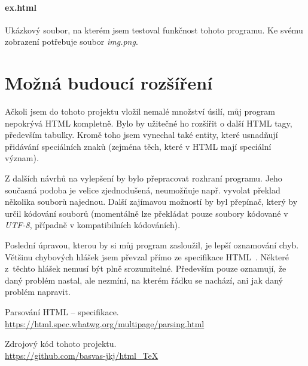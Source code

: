 \documentclass[a4paper,12pt]{article}
\begin{document}
	\paragraph{ex.html}
	Ukázkový soubor, na kterém jsem testoval funkčnost tohoto programu. Ke svému zobrazení potřebuje soubor \emph{img.png}.

	\section{Možná budoucí rozšíření}
	Ačkoli jsem do tohoto projektu vložil nemalé množství úsilí, můj program nepokrývá HTML kompletně.
	Bylo by užitečné ho rozšířit o další HTML tagy, především tabulky. Kromě toho jsem vynechal
	také entity, které usnadňují přidávání speciálních znaků (zejména těch, které v HTML mají speciální
	význam).
	
	Z dalších návrhů na vylepšení by bylo přepracovat rozhraní programu. Jeho současná podoba je velice
	zjednodušená, neumožňuje např. vyvolat překlad několika souborů najednou. Další zajímavou možností 
	by byl přepínač, který by určil kódování souborů (momentálně lze překládat pouze soubory kódované v \textit{UTF-8}, případně v kompatibilních kódováních).
	
	Poslední úpravou, kterou by si můj program zasloužil, je lepší oznamování chyb. Většinu chybových hlášek jsem převzal přímo ze specifikace HTML~\cite{specifikace}. Některé z~těchto hlášek nemusí být plně srozumitelné. Především pouze oznamují, že daný problém nastal, ale nezmíní, na kterém řádku se nachází, ani jak daný problém napravit.
	\pagebreak
	
	\begin{thebibliography}{99}
		Parsování HTML -- specifikace. \\
		\url{https://html.spec.whatwg.org/multipage/parsing.html}
		
		Zdrojový kód tohoto projektu. \\
		\url{https://github.com/basvas-jkj/html\_TeX}
	\end{thebibliography}
\end{document}
